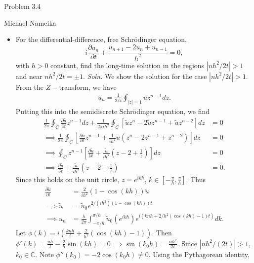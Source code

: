 \documentclass{article}
\begin{document}
\begin{center}
    {\huge Problem 3.4}
    \vspace{0.5cm}

    {\large Michael Nameika}
\end{center}
\begin{itemize}
    \item[3.4] For the differential-difference, free Schr{\"o}dinger equation,
    \[i\frac{\partial u_n}{\partial t} + \frac{u_{n+1} - 2u_n + u_{n-1}}{h^2} = 0,\]
    with $h > 0$ constant, find the long-time solution in the regions $|nh^2/2t| > 1$ and near $nh^2/2t = \pm 1$.
    \newline\newline
    \textit{Soln.} We show the solution for the case $|nh^2/2t| > 1$. From the $Z-$transform, we have
    \begin{align*}
        u_n = \frac{1}{2\pi i}\oint_{|z| = 1}\tilde{u} z^{n-1}dz.
    \end{align*}
    Putting this into the semidiscrete Schr{\"o}dinger equation, we find
    \begin{align*}
        \frac{1}{2\pi}\oint_C \frac{\partial \tilde{u}}{\partial t}z^{n-1}dz + \frac{1}{2\pi i h^2}\oint_C \left[\tilde{u}z^n - 2\tilde{u}z^{n-1} + \tilde{u}z^{n-2}\right]dz &= 0\\
        \implies \frac{1}{2\pi}\oint_C\left[\frac{\partial \tilde{u}}{\partial t}z^{n-1} + \frac{1}{ih^2}\tilde{u}\left(z^n - 2z^{n-1} + z^{n-2}\right)\right]dz &= 0\\
        \implies \oint_Cz^{n-1}\left[\frac{\partial\tilde{u}}{\partial t} + \frac{\tilde{u}}{ih^2}\left(z - 2 + \frac{1}{z}\right)\right]dz &= 0\\
        \implies \frac{\partial \tilde{u}}{\partial t} + \frac{\tilde{u}}{ih^2}\left(z - 2 + \frac{1}{z}\right) &= 0.
    \end{align*}
    Since this holds on the unit circle, $z = e^{ikh}$, $k \in \left[-\frac{\pi}{h}, \frac{\pi}{h}\right]$. Thus
    \begin{align*}
        \frac{\partial\tilde{u}}{\partial t} &= \frac{2}{ih^2}(1 - \cos(kh))\tilde{u}\\
        \implies \tilde{u} &= \tilde{u}_0e^{2/(ih^2)(1 - \cos(kh))t}\\
        \implies u_n &= \frac{h}{2\pi}\int_{-\pi/h}^{\pi/h}\tilde{u}_0(e^{ikh})e^{i(knh + 2/h^2(\cos(kh) - 1)t)}dk.
    \end{align*}
    Let $\phi(k) = i\left(\frac{knh}{t} + \frac{2}{h^2}(\cos(kh) - 1)\right)$. Then $\phi'(k) = \frac{nh}{t} - \frac{2}{h}\sin(kh) = 0 \implies \sin(k_0h) = \frac{nh^2}{2t}$. Since $|nh^2/(2t)| > 1$, $k_0 \in \mathbb{C}$. Note $\phi''(k_0) = -2\cos(k_0h) \neq 0$. Using the Pythagorean identity,

\end{itemize}
\end{document}
